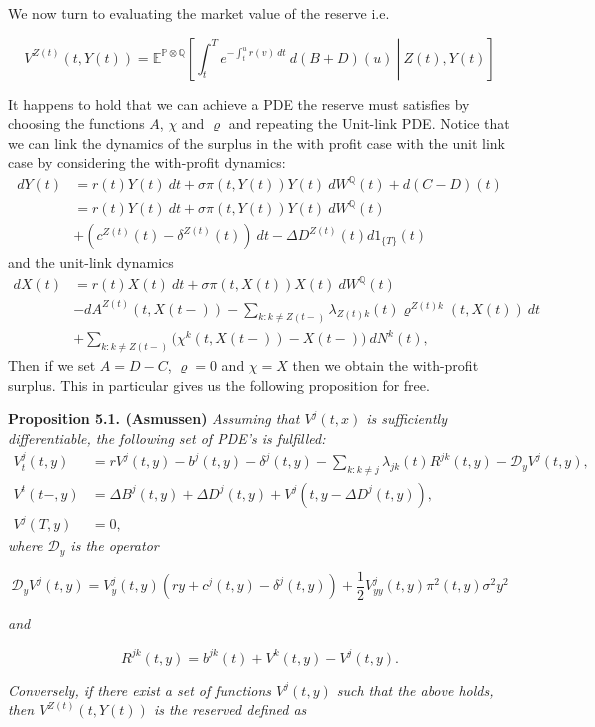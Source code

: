 \documentclass[a4paper,10pt,openany]{book}
\begin{document}
We now turn to evaluating the market value of the reserve i.e.

\[
V^{Z(t)}(t,Y(t))=\mathbb E^{\mathbb P\otimes \mathbb Q}\left[\left.\int_t^Te^{-\int_t^u r(v)\ dt}\ d(B+D)(u)\ \right\vert\ Z(t),Y(t)\right]
\]

It happens to hold that we can achieve a PDE the reserve must satisfies by choosing the functions \(A\), \(\chi\) and \(\varrho\) and repeating the Unit-link PDE. Notice that we can link the dynamics of the surplus in the with profit case with the unit link case by considering the with-profit dynamics:
\begin{align*}
dY(t)&=r(t)Y(t)\ dt + \sigma\pi(t,Y(t)) Y(t)\ dW^\mathbb Q(t) + d(C-D)(t)\\
&=r(t)Y(t)\ dt + \sigma\pi(t,Y(t)) Y(t)\ dW^\mathbb Q(t)\\
&+(c^{Z(t)}(t)-\delta^{Z(t)}(t))\ dt-\Delta D^{Z(t)}(t)d1_{\{T\}}(t)
\end{align*}
and the unit-link dynamics
\begin{align*}
dX(t)&=r(t)X(t)\ dt + \sigma\pi(t,X(t)) X(t)\ dW^\mathbb Q(t)\\
&-dA^{Z(t)}(t,X(t-))-\sum_{k:k\ne Z(t-)}\lambda_{Z(t)k}(t)\varrho^{Z(t)k}(t,X(t))\ dt\\
&+\sum_{k:k\ne Z(t-)}\Big(\chi^k(t,X(t-))-X(t-)\Big)\ dN^k(t),
\end{align*}
Then if we set \(A=D-C\), \(\varrho=0\) and \(\chi = X\) then we obtain the with-profit surplus. This in particular gives us the following proposition for free.

\textbf{Proposition 5.1. (Asmussen)} \emph{Assuming that \(V^j(t,x)\) is sufficiently differentiable, the following set of PDE's is fulfilled:}
\begin{align*}
V_t^j(t,y)&=rV^j(t,y)-b^j(t,y)-\delta^j(t,y)-\sum_{k:k\ne j}\lambda_{jk}(t)R^{jk}(t,y)-\mathcal D_y V^j(t,y),\\
V^t(t-,y)&=\Delta B^j(t,y)+\Delta D^j(t,y)+V^j(t,y-\Delta D^j(t,y)),\\
V^j(T,y)&=0,
\end{align*}
\emph{where \(\mathcal D_y\) is the operator}

\[
\mathcal D_yV^j(t,y)=V_y^j(t,y)\left(ry+c^j(t,y)-\delta^j(t,y)\right)+\frac{1}{2}V^j_{yy}(t,y)\pi^2(t,y)\sigma^2y^2
\]

\emph{and}

\[
R^{jk}(t,y)=b^{jk}(t)+V^k(t,y)-V^j(t,y).
\]

\emph{Conversely, if there exist a set of functions \(V^j(t,y)\) such that the above holds, then \(V^{Z(t)}(t,Y(t))\) is the reserved defined as}
\end{document}
